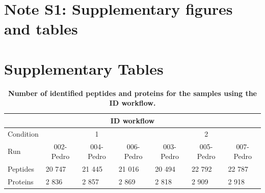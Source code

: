 \documentclass[11pt]{article}
\begin{document}
\maketitle

\section*{Note S1: Supplementary figures and tables}
\label{sec:fc-eval}

\section*{Supplementary Tables}

\begin{table}[h]
    \begin{tabular}{lllllll}
    \hline
    \multicolumn{7}{c}{ID workflow}                                                                                                                                                                                   \\ \hline
    Condition & \multicolumn{3}{c}{1}                                                                         & \multicolumn{3}{c}{2}                                                                         \\
    Run       & \multicolumn{1}{c}{002-Pedro} & \multicolumn{1}{c}{004-Pedro} & \multicolumn{1}{c}{006-Pedro} & \multicolumn{1}{c}{003-Pedro} & \multicolumn{1}{c}{005-Pedro} & \multicolumn{1}{c}{007-Pedro} \\
    Peptides  & 20 747                        & 21 445                        & 21 016                        & 20 494                        & 22 792                        & 22 787                        \\
    Proteins  & 2 836                         & 2 857                         & 2 869                         & 2 818                         & 2 909                         & 2 918                         \\ \hline
    \end{tabular}
     \caption{{\bf Number of identified peptides and proteins for the samples using the ID workflow.}
          \label{fig:osw_peptide_and_protein_id}}
\end{table}
        
\end{document}
